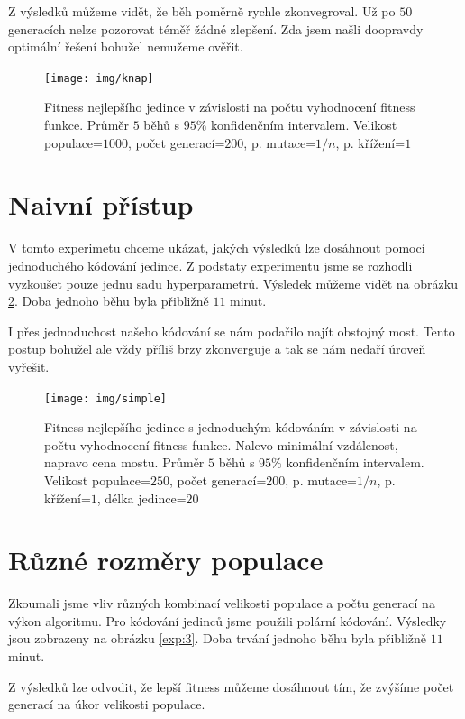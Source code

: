 Z výsledků můžeme vidět, že běh poměrně rychle zkonvegroval. Už po $50$ generacích nelze pozorovat téměř žádné zlepšení. Zda jsem našli doopravdy optimální řešení bohužel nemužeme ověřit.

\begin{figure}[p]\centering
\texttt{[image: img/knap]}
\caption{Fitness nejlepšího jedince v závislosti na počtu vyhodnocení fitness funkce. Průměr $5$ běhů s $95\%$ konfidenčním intervalem. Velikost populace=$1000$, počet generací=$200$, p. mutace=$1/n$, p. křížení=$1$}
\label{exp:1}

\end{figure}


\section{Naivní přístup}

V tomto experimetu chceme ukázat, jakých výsledků lze dosáhnout pomocí jednoduchého kódování jedince. Z podstaty experimentu jsme se rozhodli vyzkoušet pouze jednu sadu hyperparametrů. Výsledek můžeme vidět na obrázku \ref{exp:2}. Doba jednoho běhu byla přibližně $11$ minut.

I přes jednoduchost našeho kódování se nám podařilo najít obstojný most. Tento postup bohužel ale vždy příliš brzy zkonverguje a tak se nám nedaří úroveň vyřešit.

\begin{figure}[p]\centering
\texttt{[image: img/simple]}
\caption{Fitness nejlepšího jedince s jednoduchým kódováním v závislosti na počtu vyhodnocení fitness funkce. Nalevo minimální vzdálenost, napravo cena mostu. Průměr $5$ běhů s $95\%$ konfidenčním intervalem. Velikost populace=$250$, počet generací=$200$, p. mutace=$1/n$, p. křížení=$1$, délka jedince=$20$}
\label{exp:2}
\end{figure}


\section{Různé rozměry populace} \label{sizes}

Zkoumali jsme vliv různých kombinací velikosti populace a počtu generací na výkon algoritmu. Pro kódování jedinců jsme použili polární kódování. Výsledky jsou zobrazeny na obrázku \ref{exp:3}. Doba trvání jednoho běhu byla přibližně $11$ minut.

Z výsledků lze odvodit, že lepší fitness můžeme dosáhnout tím, že zvýšíme počet generací na úkor velikosti populace.

